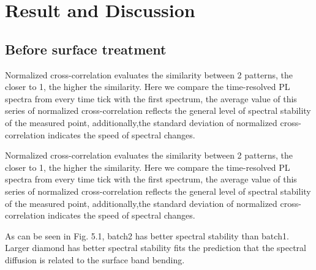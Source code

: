 \chapter{Result and Discussion} %

\label{Chapter2.75} %

\section{Before surface treatment}

Normalized cross-correlation evaluates the similarity between 2 patterns, the closer to 1, the higher the similarity. Here we compare the time-resolved PL spectra from every time tick with the first spectrum, the average value of this series of normalized cross-correlation reflects the general level of spectral stability of the measured point, additionally,the standard deviation of normalized cross-correlation indicates the speed of spectral changes.



Normalized cross-correlation evaluates the similarity between 2 patterns, the closer to 1, the higher the similarity. Here we compare the time-resolved PL spectra from every time tick with the first spectrum, the average value of this series of normalized cross-correlation reflects the general level of spectral stability of the measured point, additionally,the standard deviation of normalized cross-correlation indicates the speed of spectral changes.

As can be seen in Fig. 5.1, batch2 has better spectral stability than batch1. Larger diamond has better spectral stability fits the prediction that the spectral diffusion is related to the surface band bending. 

